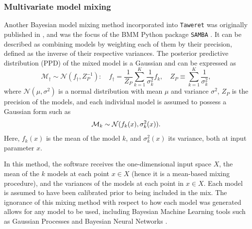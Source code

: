 \documentclass[10pt, preprint,aps,prc,floatfix,
tightenlines,
nofootinbib,superscriptaddress]{revtex4-2}
\begin{document}

\subsubsection{Multivariate model mixing} %

Another Bayesian model mixing method incorporated into \texttt{Taweret} was originally published in \cite{Semposki:2022gcp}, and was the focus of the BMM Python package \texttt{SAMBA} \cite{SAMBA}. It can be described as combining models by weighting each of them by their precision, defined as the inverse of their respective variances. The posterior predictive distribution (PPD) of the mixed model is a Gaussian and can be expressed as
\begin{equation}
    \label{eq:multi_mm_gaussian}
   \mathcal M_\dagger \sim {\mathcal N(f_\dagger, Z_P^{-1})}:
    \quad
    f_{\dagger} = \frac{1}{Z_P}\sum_{k=1}^{K} \frac{1}{\sigma^{2}_k}f_k,
    \quad Z_P \equiv \sum_{k=1}^{K}\frac{1}{\sigma^{2}_k},
\end{equation}
where $\mathcal N(\mu, \sigma^2)$ is a normal distribution with mean $\mu$ and variance $\sigma^2$, $Z_{P}$ is the precision of the models, and each individual model is assumed to possess a Gaussian form such as
\begin{equation}
    {\cal M}_{k} \sim {\cal N}(f_{k}(x),\sigma^2_{k}(x)).
\end{equation}
Here, $f_{k}(x)$ is the mean of the model $k$, and $\sigma^{2}_{k}(x)$ its variance, both at input parameter $x$.

In this method, the software receives the one-dimensional input space $X$, the mean of the $k$ models at each point $ x \in X$ (hence it is a mean-based mixing procedure), and the variances of the models at each point in $x \in X$. Each model is assumed to have been calibrated prior to being included in the mix. The ignorance of this mixing method with respect to how each model was generated allows for any model to be used, including Bayesian Machine Learning tools such as Gaussian Processes \cite{Semposki:2022gcp} and Bayesian Neural Networks \cite{Kronheim:2020dmp}.
\end{document}
